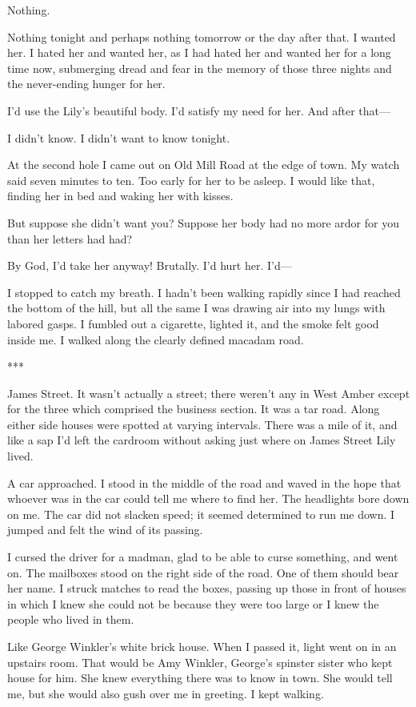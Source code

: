 \documentclass{novel}
\begin{document}
Nothing.

Nothing tonight and perhaps nothing tomorrow or the day after that. I wanted her. I hated her and wanted her, as I had hated her and wanted her for a long time now, submerging dread and fear in the memory of those three nights and the never-ending hunger for her.

I’d use the Lily’s beautiful body. I’d satisfy my need for her. And after that—

I didn’t know. I didn’t want to know tonight.

At the second hole I came out on Old Mill Road at the edge of town. My watch said seven minutes to ten. Too early for her to be asleep. I would like that, finding her in bed and waking her with kisses.

But suppose she didn’t want you? Suppose her body had no more ardor for you than her letters had had?

By God, I’d take her anyway! Brutally. I’d hurt her. I’d—

I stopped to catch my breath. I hadn’t been walking rapidly since I had reached the bottom of the hill, but all the same I was drawing air into my lungs with labored gasps. I fumbled out a cigarette, lighted it, and the smoke felt good inside me. I walked along the clearly defined macadam road.

***

James Street. It wasn’t actually a street; there weren’t any in West Amber except for the three which comprised the business section. It was a tar road. Along either side houses were spotted at varying intervals. There was a mile of it, and like a sap I’d left the cardroom without asking just where on James Street Lily lived.

A car approached. I stood in the middle of the road and waved in the hope that whoever was in the car could tell me where to find her. The headlights bore down on me. The car did not slacken speed; it seemed determined to run me down. I jumped and felt the wind of its passing.

I cursed the driver for a madman, glad to be able to curse something, and went on. The mailboxes stood on the right side of the road. One of them should bear her name. I struck matches to read the boxes, passing up those in front of houses in which I knew she could not be because they were too large or I knew the people who lived in them.

Like George Winkler’s white brick house. When I passed it, light went on in an upstairs room. That would be Amy Winkler, George’s spinster sister who kept house for him. She knew everything there was to know in town. She would tell me, but she would also gush over me in greeting. I kept walking.
\end{document}
